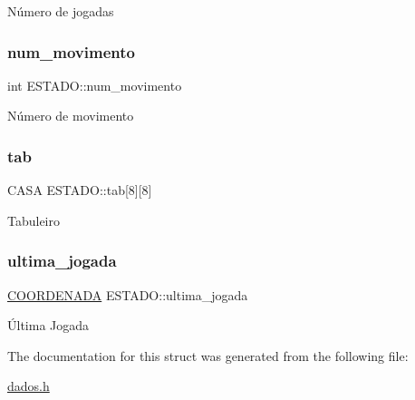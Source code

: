 Número de jogadas \mbox{\label{structESTADO_a2a04cf6054f85e3dbee5fb8cc08e7264}} 
\subsubsection{\texorpdfstring{num\+\_\+movimento}{num\_movimento}}
{\footnotesize\ttfamily int E\+S\+T\+A\+D\+O\+::num\+\_\+movimento}

Número de movimento \mbox{\label{structESTADO_ab56f0f1be16954d3768b4174d14c087d}} 
\subsubsection{\texorpdfstring{tab}{tab}}
{\footnotesize\ttfamily C\+A\+SA E\+S\+T\+A\+D\+O\+::tab\mbox{[}8\mbox{]}\mbox{[}8\mbox{]}}

Tabuleiro \mbox{\label{structESTADO_a4896a5c5c1f40b43fb795623327e3f47}} 
\subsubsection{\texorpdfstring{ultima\+\_\+jogada}{ultima\_jogada}}
{\footnotesize\ttfamily \hyperlink{structCOORDENADA}{C\+O\+O\+R\+D\+E\+N\+A\+DA} E\+S\+T\+A\+D\+O\+::ultima\+\_\+jogada}

Última Jogada 

The documentation for this struct was generated from the following file\+:\begin{DoxyCompactItemize}
\item 
\hyperlink{dados_8h}{dados.\+h}\end{DoxyCompactItemize}

